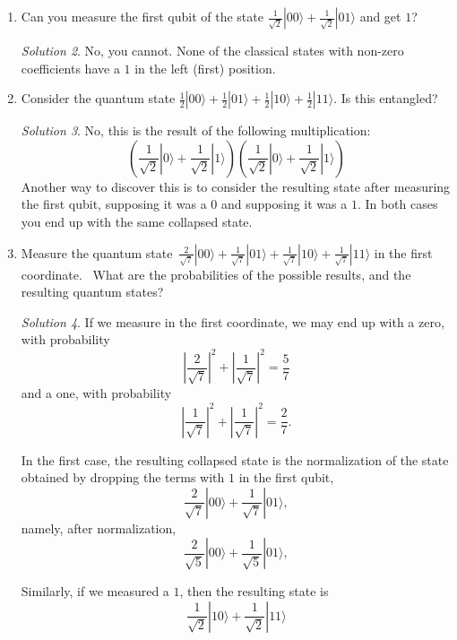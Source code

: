 \documentclass{article}
\theoremstyle{plain}
\theoremstyle{definition}
\theoremstyle{remark}
\newtheorem*{solution}{Solution}
\numberwithin{theorem}{section}
\begin{document}
\begin{enumerate}
\begin{enumerate}
	
		\begin{solution}
		All the states with last qubit $\ket{0}$ disappear from the summation.  That leaves exactly half of them, i.e. those where $x$ is odd.  Therefore we have
\[
	\frac{1}{\sqrt{2^{n-1}}} \sum_{x=0}^{2^{n-1}-1} \ket{\overrightarrow{2x+1}}\ket{1}.
		\]
		\end{solution}


\end{enumerate}

\item Can you measure the first qubit of the state $\frac{1}{\sqrt{2}} |00 \rangle + \frac{1}{\sqrt{2}}|01 \rangle$ and get $1$?

\begin{solution}
No, you cannot.  None of the classical states with non-zero coefficients have a $1$ in the left (first) position.
\end{solution}

\item Consider the quantum state $\frac{1}{2} |00 \rangle + \frac{1}{2} |01 \rangle + \frac{1}{2} |10 \rangle + \frac{1}{2} |11 \rangle$. Is this entangled?

\begin{solution}
No, this is the result of the following multiplication:
\[
\left(
\frac{1}{\sqrt{2}} |0 \rangle 
+ \frac{1}{\sqrt{2}} |1 \rangle
\right)
\left(
 \frac{1}{\sqrt{2}} |0 \rangle + \frac{1}{\sqrt{2}} |1 \rangle
\right)
\]
Another way to discover this is to consider the resulting state after measuring the first qubit, supposing it was a $0$ and supposing it was a $1$.  In both cases you end up with the same collapsed state.
\end{solution}

\item Measure the quantum state $\frac{2}{\sqrt{7}} |00 \rangle + \frac{1}{\sqrt{7}} |01 \rangle + \frac{1}{\sqrt{7}} |10 \rangle + \frac{1}{\sqrt{7}} |11 \rangle$ in the first coordinate.  What are the probabilities of the possible results, and the resulting quantum states?

\begin{solution}
If we measure in the first coordinate, we may end up with a zero, with probability
\[
\left| \frac{2}{\sqrt{7}} \right|^2 + 
\left| \frac{1}{\sqrt{7}} \right|^2 = \frac{5}{7}
\]
and a one, with probability
\[
\left| \frac{1}{\sqrt{7}} \right|^2 + 
\left| \frac{1}{\sqrt{7}} \right|^2 = \frac{2}{7}.
\]

In the first case, the resulting collapsed state is the normalization of the state obtained by dropping the terms with $1$ in the first qubit,
\[
\frac{2}{\sqrt{7}} |00 \rangle + \frac{1}{\sqrt{7}} |01 \rangle,
\]
namely, after normalization,
\[
\frac{2}{\sqrt{5}} |00 \rangle + \frac{1}{\sqrt{5}} |01 \rangle,
\]

Similarly, if we measured a $1$, then the resulting state is
\[
\frac{1}{\sqrt{2}} |10 \rangle + \frac{1}{\sqrt{2}} |11 \rangle
\]
\end{solution}

\end{enumerate}
\end{document}
